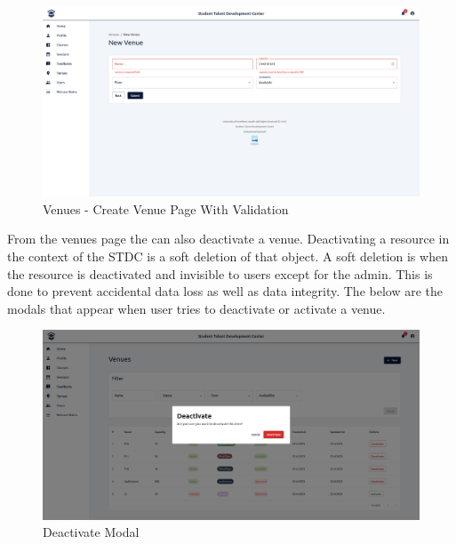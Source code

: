 \begin{justify}
    \begin{figure}[H]
        \centerline{\includegraphics[width=150mm,scale=1]{figures/implementation_and_testing/implementation/frontend/pages/Venues - Create (Error).png}}
        \caption{Venues - Create Venue Page With Validation}
    \end{figure}

    \vspace{0.25cm}
    \newendline From the venues page the can also deactivate a venue. Deactivating a resource in the context of the STDC is a soft deletion of that object. A soft deletion is when the resource is deactivated and invisible to users except for the admin. This is done to prevent accidental data loss as well as data integrity. The below are the modals that appear when user tries to deactivate or activate a venue.

    \begin{figure}[H]
        \centerline{\includegraphics[width=150mm,scale=1]{figures/implementation_and_testing/implementation/frontend/pages/Deactivate Modal.png}}
        \caption{Deactivate Modal}
    \end{figure}


\end{justify}
